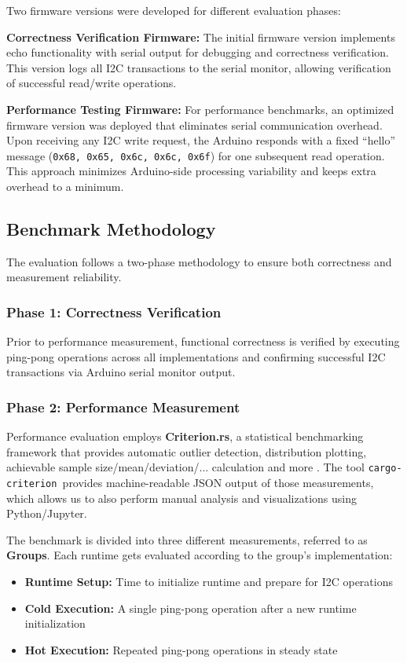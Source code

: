 Two firmware versions were developed for different evaluation phases:

\textbf{Correctness Verification Firmware:}
The initial firmware version implements echo functionality with serial output for debugging and correctness verification. This version logs all I2C transactions to the serial monitor, allowing verification of successful read/write operations.

\textbf{Performance Testing Firmware:}
For performance benchmarks, an optimized firmware version was deployed that eliminates serial communication overhead. Upon receiving any I2C write request, the Arduino responds with a fixed ``hello'' message (\texttt{0x68, 0x65, 0x6c, 0x6c, 0x6f}) for one subsequent read operation. This approach minimizes Arduino-side processing variability and keeps extra overhead to a minimum.

\subsection{Benchmark Methodology}
\label{subsec:eval-setup-bench}

The evaluation follows a two-phase methodology to ensure both correctness and measurement reliability.

\subsubsection{Phase 1: Correctness Verification}
Prior to performance measurement, functional correctness is verified by executing ping-pong operations across all implementations and confirming successful I2C transactions via Arduino serial monitor output.

\subsubsection{Phase 2: Performance Measurement}
Performance evaluation employs \textbf{Criterion.rs}, a statistical benchmarking framework that provides automatic outlier detection, distribution plotting, achievable sample size/mean/deviation/... calculation and more \cite{criterion_rs}. The tool \texttt{cargo-criterion }provides machine-readable JSON output of those measurements, which allows us to also perform manual analysis and visualizations using Python/Jupyter.

The benchmark is divided into three different measurements, referred to as \textbf{Groups}. Each runtime gets evaluated according to the group's implementation:
\begin{itemize}
    \item \textbf{Runtime Setup:} Time to initialize runtime and prepare for I2C operations
    \item \textbf{Cold Execution:} A single ping-pong operation after a new runtime initialization
    \item \textbf{Hot Execution:} Repeated ping-pong operations in steady state
\end{itemize}

